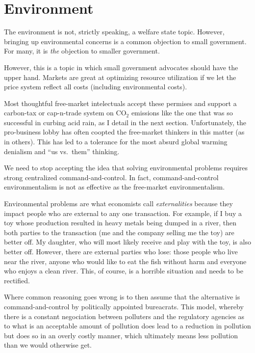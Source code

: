 \chapter{Environment}
\label{chpt:environment}

The environment is not, strictly speaking, a welfare state topic. However,
bringing up environmental concerns is a common objection to small government.
For many, it is \emph{the} objection to smaller government.

However, this is a topic in which small government advocates should have the
upper hand. Markets are great at optimizing resource utilization if we let the
price system reflect all costs (including environmental costs).

Most thoughtful free-market intelectuals accept these permises and support a
carbon-tax or cap-n-trade system on CO$_2$ emissions like the one that was so
successful in curbing acid rain, as I detail in the next section.
Unfortunately, the pro-business lobby has often coopted the free-market
thinkers in this matter (as in others). This has led to a tolerance for the
most absurd global warming denialism and ``us vs.\ them'' thinking.

We need to stop accepting the idea that solving environmental problems requires
strong centralized command-and-control. In fact, command-and-control
environmentalism is not as effective as the free-market environmentalism.

Environmental problems are what economists call \emph{externalities} because
they impact people who are external to any one transaction. For example, if I
buy a toy whose production resulted in heavy metals being dumped in a river,
then both parties to the transaction (me and the company selling me the toy)
are better off. My daughter, who will most likely receive and play with the
toy, is also better off. However, there are external parties who lose: those
people who live near the river, anyone who would like to eat the fish without
harm and everyone who enjoys a clean river. This, of course, is a horrible
situation and needs to be rectified.

Where common reasoning goes wrong is to then assume that the alternative is
command-and-control by politically appointed bureacrats. This model, whereby
there is a constant negociation between polluters and the regulatory agencies
as to what is an acceptable amount of pollution does lead to a reduction in
pollution but does so in an overly costly manner, which ultimately means less
pollution than we would otherwise get.

